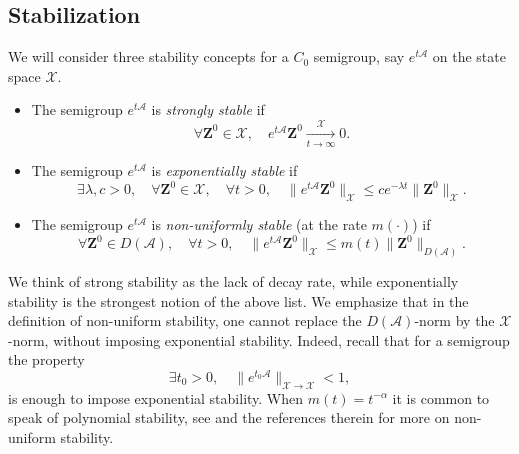 \documentclass[10pt]{article}
\begin{document}
\subsection{Stabilization}\label{sec:intro_stbl}
We will consider three stability concepts for a $C_0$ semigroup, say $e^{t \mathcal{A}}$ on the state space $\mathcal{X}$. 
\begin{itemize}
    \item The semigroup $e^{t \mathcal{A}}$ is \textit{strongly stable} if 
    \[
    \forall \mathbf{Z}^0 \in \mathcal{X},\quad e^{t \mathcal{A}} \mathbf{Z}^0 \xrightarrow[t \to \infty]{\mathcal{X}} 0. 
    \]
    \item The semigroup $e^{t \mathcal{A}}$ is \textit{exponentially stable} if 
    \[
    \exists \lambda,c > 0,\quad \forall \mathbf{Z}^0 \in \mathcal{X},\quad \forall t > 0,\quad \|e^{t \mathcal{A}}\mathbf{Z}^0 \|_\mathcal{X} \leq c e^{-\lambda t} \|\mathbf{Z}^0 \|_\mathcal{X}.
    \]
    \item The semigroup $e^{t \mathcal{A}}$ is \textit{non-uniformly stable} (at the rate $m(\cdot)$) if 
    \[
    \forall \mathbf{Z}^0 \in D(\mathcal{A}),\quad \forall t > 0,\quad \|e^{t \mathcal{A}}\mathbf{Z}^0 \|_\mathcal{X} \leq m(t) \|\mathbf{Z}^0 \|_{D(\mathcal{A})}.
    \]
\end{itemize}
We think of strong stability as the lack of decay rate, while exponentially stability is the strongest notion of the above list. We emphasize that in the definition of non-uniform stability, one cannot replace the $D(\mathcal{A})$-norm by the $\mathcal{X}$-norm, without imposing exponential stability. Indeed, recall that for a semigroup the property 
\[
\exists t_0 > 0,\quad \| e^{t_0 \mathcal{A}} \|_{\mathcal{X} \to \mathcal{X}} < 1,
\]
is enough to impose exponential stability. When $m(t) = t^{-\alpha}$ it is common to speak of polynomial stability, see \cite{batty_duyckaerts,batty_tomilov,rozendaal} and the references therein for more on non-uniform stability.
\newline
\newline
\end{document}
